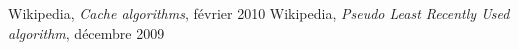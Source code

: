 ﻿%

\begin{thebibliography}{2}
 Wikipedia, {\it Cache algorithms}, février 2010
 Wikipedia, {\it Pseudo Least Recently Used algorithm}, décembre 2009
\end{thebibliography}
